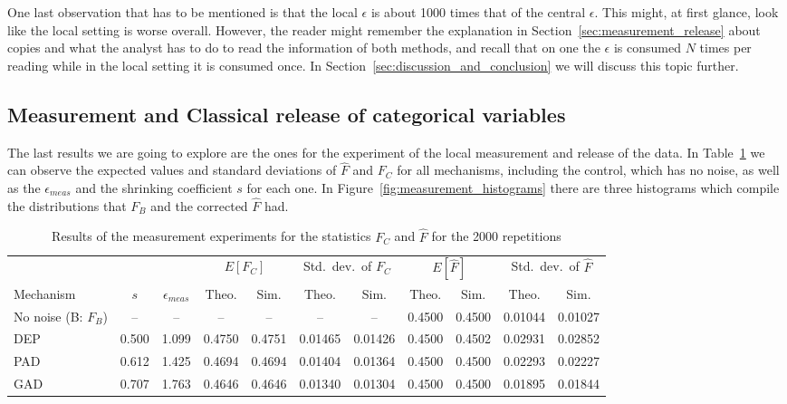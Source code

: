 \documentclass{ieeeaccess}
\begin{document}
One last observation that has to be mentioned is that the local $\epsilon$ is about 1000 times that of the central $\epsilon$. This might, at first glance, look like the local setting is worse overall. However, the reader might remember the explanation in Section~\ref{sec:measurement_release} about copies and what the analyst has to do to read the information of both methods, and recall that on one the $\epsilon$ is consumed $N$ times per reading while in the local setting it is consumed once. In Section~\ref{sec:discussion_and_conclusion} we will discuss this topic further.  

\subsection{Measurement and Classical release of categorical variables}
\label{subsec:measurement_results}

The last results we are going to explore are the ones for the experiment of the local measurement and release of the data. In Table~\ref{tab:measurement_results} we can observe the expected values and standard deviations of $\hat{F}$ and $F_C$ for all mechanisms, including the control, which has no noise, as well as the $\epsilon_{meas}$ and the shrinking coefficient $s$ for each one. In Figure~\ref{fig:measurement_histograms} there are three histograms which compile the distributions that $F_B$ and the corrected $\hat{F}$ had.

\begin{table}[!t]
  \caption{Results of the measurement experiments for the statistics $F_C$ and $\hat{F}$ for the 2000 repetitions}
  \label{tab:measurement_results}
  \centering
  \begin{tabular}{lcccccccccc}
    \toprule
     & & & \multicolumn{2}{c}{$E[F_C]$} & \multicolumn{2}{c}{Std.\ dev.\ of $F_C$} & \multicolumn{2}{c}{$E[\hat{F}]$} & \multicolumn{2}{c}{Std.\ dev.\ of $\hat{F}$} \\
    \cmidrule(lr){4-5} \cmidrule(lr){6-7} \cmidrule(lr){8-9} \cmidrule(l){10-11}
    Mechanism & $s$ & $\epsilon_{meas}$ & Theo. & Sim. & Theo. & Sim. & Theo. & Sim. & Theo. & Sim. \\
    \midrule
    No noise (B: $F_B$) & --    & --    & --     & --     & --      & --      & 0.4500 & 0.4500 & 0.01044 & 0.01027 \\
    DEP                 & 0.500 & 1.099 & 0.4750 & 0.4751 & 0.01465 & 0.01426 & 0.4500 & 0.4502 & 0.02931 & 0.02852 \\
    PAD                 & 0.612 & 1.425 & 0.4694 & 0.4694 & 0.01404 & 0.01364 & 0.4500 & 0.4500 & 0.02293 & 0.02227 \\
    GAD                 & 0.707 & 1.763 & 0.4646 & 0.4646 & 0.01340 & 0.01304 & 0.4500 & 0.4500 & 0.01895 & 0.01844 \\
    \bottomrule
  \end{tabular}
\end{table}
\end{document}
